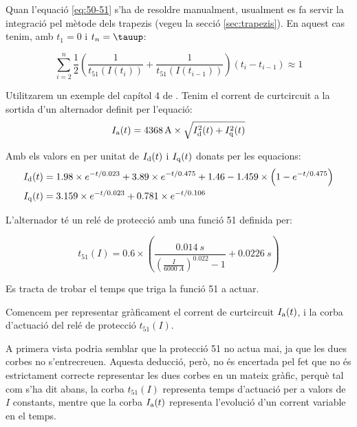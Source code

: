 Quan l'equació \eqref{eq:50-51} s'ha de resoldre manualment, usualment es fa servir la integració pel mètode dels trapezis (vegeu la secció \vref{sec:trapezis}). En aquest cas tenim, amb $t_1 = 0$ i $t_n = \tauup$:

\begin{equation}\label{eq:50-51-aprox}
	\sum_{i=2}^n \frac{1}{2} \left( \frac{1}{t_{51}(I(t_i))} + \frac{1}{t_{51}(I(t_{i-1}))} \right) (t_i - t_{i-1}) \approx 1
\end{equation}


\begin{exemple}\label{ex:ProtInvIntVar}
	\addcontentsxms{\ProtInvIntVar}	
	Utilitzarem un exemple del capítol 4 de \cite{REI}. Tenim el corrent de curtcircuit a la sortida d'un alternador definit per l'equació:
	\[
		I_\mathrm{a}(t) = \qty{4368}{A} \times \sqrt{I_\mathrm{d}^2(t) + I_\mathrm{q}^2(t)}
	\]
	
	Amb els valors en per unitat de $I_\mathrm{d}(t)$ i $I_\mathrm{q}(t)$ donats per les equacions:
	\begin{align*}
		I_\mathrm{d}(t) &= \num{1,98} \times e^{-t/\num{0,023}} + \num{3,89} \times e^{-t/\num{0,475}} + \num{1,46} - \num{1,459} \times \left( 1 - e^{-t/\num{0,475}}\right) \\
		I_\mathrm{q}(t) &= 	\num{3,159} \times e^{-t/\num{0,023}} + \num{0,781} \times e^{-t/\num{0,106}}
	\end{align*}
	
	L'alternador té un relé de protecció amb una funció 51 definida per:
	
	\[
		t_{51}(I) = \num{0,6} \times \left(  \frac{\qty{0,014}{s}}{\left( \frac{I}{\qty{6000}{A}} \right) ^{\num{0,022}} -1} + \qty{0,0226}{s} \right)  
	\]
	
	Es tracta de trobar el temps que triga la funció 51 a actuar.
	
	Comencem per representar gràficament el corrent de curtcircuit $I_\mathrm{a}(t)$, i la corba d'actuació del relé de protecció $t_{51}(I)$.
	
	\begin{center}
		
	\end{center}
 	
 	A primera vista podria semblar que la protecció 51 no actua mai, ja que les dues corbes no s'entrecreuen. Aquesta deducció, però,  no és encertada pel fet que  no és estrictament correcte representar les dues corbes en un mateix gràfic, perquè tal com s'ha dit abans, la corba $t_{51}(I)$ representa temps d'actuació per a valors de $I$ constants, mentre que la corba $I_\mathrm{a}(t)$ representa l'evolució d'un corrent variable en el temps.
 	

\end{exemple}
